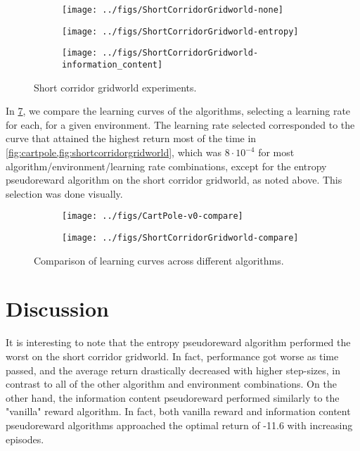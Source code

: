 \documentclass{article}
\begin{document}
  \begin{figure}
    \begin{subfigure}{\textwidth}
      \centering
      \texttt{[image: ../figs/ShortCorridorGridworld-none]}
      \label{fig:shortcorridorgridworld-none}
    \end{subfigure}
    \begin{subfigure}{\textwidth}
      \centering
      \texttt{[image: ../figs/ShortCorridorGridworld-entropy]}
      \label{fig:shortcorridorgridworld-entropy}
    \end{subfigure}
    \begin{subfigure}{\textwidth}
      \centering
      \texttt{[image: ../figs/ShortCorridorGridworld-information\_content]}
      \label{fig:shortcorridorgridworld-information-content}
    \end{subfigure}
    \caption{Short corridor gridworld experiments.}
    \label{fig:shortcorridorgridworld}
  \end{figure}


  In \cref{fig:compare}, we compare the learning curves of the algorithms, selecting a learning rate for each, for a given environment. The learning rate selected corresponded to the curve that attained the highest return most of the time in \cref{fig:cartpole,fig:shortcorridorgridworld}, which was $8 \cdot 10^{-4}$ for most algorithm/environment/learning rate combinations, except for the entropy pseudoreward algorithm on the short corridor gridworld, as noted above. This selection was done visually.

  \begin{figure}
    \centering
    \begin{subfigure}{\textwidth}
      \centering
      \texttt{[image: ../figs/CartPole-v0-compare]}
      \label{fig:compare-cartpole}
    \end{subfigure}
    \begin{subfigure}{\textwidth}
      \centering
      \texttt{[image: ../figs/ShortCorridorGridworld-compare]}
      \label{fig:compare-shortcorridorgridworld}
    \end{subfigure}
    \caption{Comparison of learning curves across different algorithms. }
    \label{fig:compare}
  \end{figure}



  \section{Discussion}
  It is interesting to note that the entropy pseudoreward algorithm performed the worst on the short corridor gridworld. In fact, performance got worse as time passed, and the average return drastically decreased with higher step-sizes, in contrast to all of the other algorithm and environment combinations. On the other hand, the information content pseudoreward performed similarly to the "vanilla" reward algorithm. In fact, both vanilla reward and information content pseudoreward algorithms approached the optimal return of -11.6 \citep[p.~323]{sutton2018reinforcement} with increasing episodes.
\end{document}
